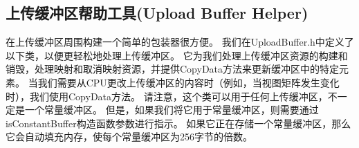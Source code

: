 \subsection{上传缓冲区帮助工具(Upload Buffer Helper)}
\begin{flushleft}
在上传缓冲区周围构建一个简单的包装器很方便。 我们在UploadBuffer.h中定义了以下类，以便更轻松地处理上传缓冲区。 它为我们处理上传缓冲区资源的构建和销毁，处理映射和取消映射资源，并提供CopyData方法来更新缓冲区中的特定元素。 当我们需要从CPU更改上传缓冲区的内容时（例如，当视图矩阵发生变化时），我们使用CopyData方法。 请注意，这个类可以用于任何上传缓冲区，不一定是一个常量缓冲区。 但是，如果我们将它用于常量缓冲区，则需要通过isConstantBuffer构造函数参数进行指示。 如果它正在存储一个常量缓冲区，那么它会自动填充内存，使每个常量缓冲区为256字节的倍数。
\end{flushleft}
